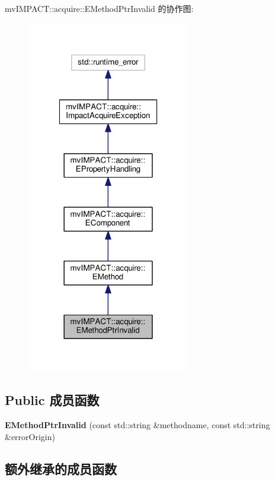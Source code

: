 mv\+I\+M\+P\+A\+C\+T\+:\+:acquire\+:\+:E\+Method\+Ptr\+Invalid 的协作图\+:
\nopagebreak
\begin{figure}[H]
\begin{center}
\leavevmode
\includegraphics[width=202pt]{classmv_i_m_p_a_c_t_1_1acquire_1_1_e_method_ptr_invalid__coll__graph}
\end{center}
\end{figure}
\subsection*{Public 成员函数}
\begin{DoxyCompactItemize}
\item 
\hypertarget{classmv_i_m_p_a_c_t_1_1acquire_1_1_e_method_ptr_invalid_a05609527beecf4e9c8c4266b25df5079}{{\bfseries E\+Method\+Ptr\+Invalid} (const std\+::string \&methodname, const std\+::string \&error\+Origin)}\label{classmv_i_m_p_a_c_t_1_1acquire_1_1_e_method_ptr_invalid_a05609527beecf4e9c8c4266b25df5079}

\end{DoxyCompactItemize}
\subsection*{额外继承的成员函数}


